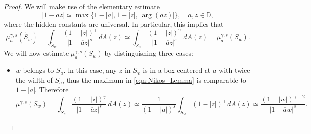 \documentclass[12pt]{amsart}
\theoremstyle{definition}
\newcommand{\D}{\mathbb{{D}}}
\numberwithin{equation}{section}
\begin{document}
        \begin{proof}
            We will make use of the elementary estimate
                \begin{equation}\label{eqn:Nikos_Lemma}
                    |1-\overline az|\simeq\max\{1-|a|, 1-|z|, |\arg(\overline az)|\}, \quad a,z\in\D,
                \end{equation}
                where the hidden constants are universal. In particular, this implies that
                \[
                    \mu^{\gamma, s}_a(\tilde S_w)=\int_{\tilde S_w}\frac{(1-|z|)^\gamma}{|1-\overline az|^s}~dA(z)\simeq\int_{ S_w}\frac{(1-|z|)^\gamma}{|1-\overline az|^s}~dA(z)=\mu^{\gamma, s}_a(S_w).
                \]
                We will now estimate $\mu^{\gamma, s}_a(S_w)$ by distinguishing three cases:
        
            \begin{itemize}
                \item $w$ belongs to $S_a$. In this case, any $z$ in $S_w$ is in a box centered at $a$ with twice the width of $S_a$, thus the maximum in \eqref{eqn:Nikos_Lemma} is comparable to $1-|a|$. Therefore
                    \[
                        \mu^{\gamma, s}(S_w)=\int_{ S_w}\frac{(1-|z|)^\gamma}{|1-\overline az|^s}~dA(z)\simeq\frac{1}{(1-|a|)^s}\int_{ S_w}(1-|z|)^\gamma~dA(z)\simeq\frac{(1-|w|)^{\gamma+2}}{|1-\overline aw|^s}.
                    \]
            

\end{itemize}
\end{proof}
\end{document}
